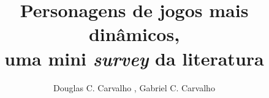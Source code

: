 \documentclass[12pt]{article}
\title{Personagens de jogos mais dinâmicos,
\\ uma mini \textit{survey} da literatura}
\author{Douglas C. Carvalho \inst{1}, Gabriel C. Carvalho \inst{1}}
\begin{document}
 

  \maketitle

  

  

  

  

  

  \renewcommand{\refname}{Bibliografia}
  
  
\end{document}
